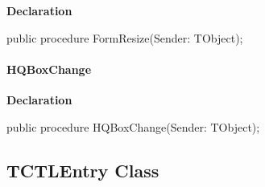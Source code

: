 \documentclass{report}
\newif\ifpdf
\begin{document}
\label{swcatalog.TSCForm-FormResize}
\begin{list}{}{
\setlength{\itemindent}{0cm}
\setlength{\listparindent}{0cm}
\setlength{\leftmargin}{\evensidemargin}
\addtolength{\leftmargin}{\tmplength}
\settowidth{\labelsep}{X}
\addtolength{\leftmargin}{\labelsep}
\setlength{\labelwidth}{\tmplength}
}
\item[\textbf{Declaration}\hfill]
\ifpdf
\begin{flushleft}
\fi
\begin{ttfamily}
public procedure FormResize(Sender: TObject);\end{ttfamily}

\ifpdf
\end{flushleft}
\fi

\end{list}
\paragraph*{HQBoxChange}\hspace*{\fill}

\label{swcatalog.TSCForm-HQBoxChange}
\begin{list}{}{
\setlength{\itemindent}{0cm}
\setlength{\listparindent}{0cm}
\setlength{\leftmargin}{\evensidemargin}
\addtolength{\leftmargin}{\tmplength}
\settowidth{\labelsep}{X}
\addtolength{\leftmargin}{\labelsep}
\setlength{\labelwidth}{\tmplength}
}
\item[\textbf{Declaration}\hfill]
\ifpdf
\begin{flushleft}
\fi
\begin{ttfamily}
public procedure HQBoxChange(Sender: TObject);\end{ttfamily}

\ifpdf
\end{flushleft}
\fi

\end{list}
\ifpdf
\subsection*{\large{\textbf{TCTLEntry Class}}\normalsize\hspace{1ex}\hrulefill}
\else
\subsection*{TCTLEntry Class}
\fi
\label{swcatalog.TCTLEntry}
\end{document}
